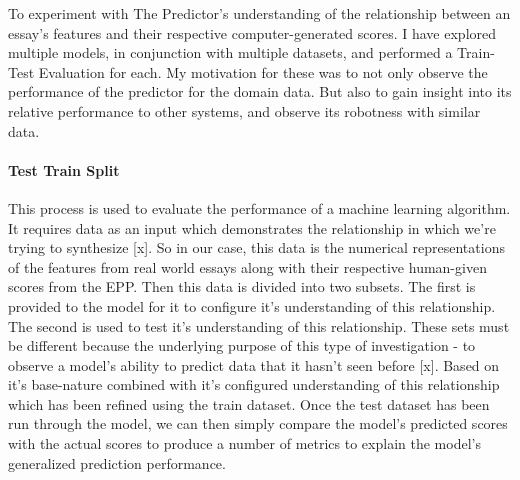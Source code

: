 To experiment with The Predictor’s understanding of the relationship between an essay's features and their respective computer-generated scores. I have explored multiple models, in conjunction with multiple datasets, and performed a Train-Test Evaluation for each. My motivation for these was to not only observe the performance of the predictor for the domain data. But also to gain insight into its relative performance to other systems, and observe its robotness with similar data. 

\paragraph{Test Train Split}
This process is used to evaluate the performance of a machine learning algorithm. It requires data as an input which demonstrates the relationship in which we’re trying to synthesize [x]. So in our case, this data is the numerical representations of the features from real world essays along with their respective human-given scores from the EPP. Then this data is divided into two subsets. The first is provided to the model for it to configure it’s understanding of this relationship. The second is used to test it’s understanding of this relationship. These sets must be different because the underlying purpose of this type of investigation - to observe a model's ability to predict data that it hasn’t seen before [x]. Based on it’s base-nature combined with it’s configured understanding of this relationship which has been refined using the train dataset. Once the test dataset has been run through the model, we can then simply compare the model's predicted scores with the actual scores to produce a number of metrics to explain the model's generalized prediction performance. 


